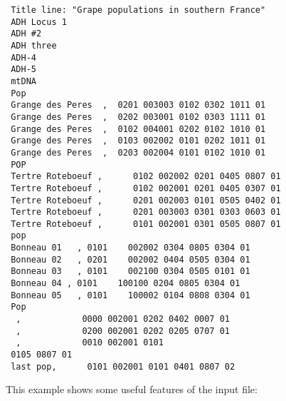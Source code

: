 \documentclass[12pt,]{book}
\begin{document}
\begin{verbatim}
 Title line: "Grape populations in southern France"
 ADH Locus 1
 ADH #2
 ADH three
 ADH-4
 ADH-5
 mtDNA
 Pop
 Grange des Peres  ,  0201 003003 0102 0302 1011 01
 Grange des Peres  ,  0202 003001 0102 0303 1111 01
 Grange des Peres  ,  0102 004001 0202 0102 1010 01
 Grange des Peres  ,  0103 002002 0101 0202 1011 01
 Grange des Peres  ,  0203 002004 0101 0102 1010 01
 POP
 Tertre Roteboeuf ,      0102 002002 0201 0405 0807 01
 Tertre Roteboeuf ,      0102 002001 0201 0405 0307 01
 Tertre Roteboeuf ,      0201 002003 0101 0505 0402 01
 Tertre Roteboeuf ,      0201 003003 0301 0303 0603 01
 Tertre Roteboeuf ,      0101 002001 0301 0505 0807 01
 pop
 Bonneau 01   , 0101    002002 0304 0805 0304 01
 Bonneau 02   , 0201    002002 0404 0505 0304 01
 Bonneau 03   , 0101    002100 0304 0505 0101 01
 Bonneau 04 , 0101    100100 0204 0805 0304 01
 Bonneau 05   , 0101    100002 0104 0808 0304 01
 Pop
  ,            0000 002001 0202 0402 0007 01
  ,            0200 002001 0202 0205 0707 01
  ,            0010 002001 0101
 0105 0807 01
 last pop,      0101 002001 0101 0401 0807 02
\end{verbatim}

This example shows some useful features of the input file:
\end{document}
